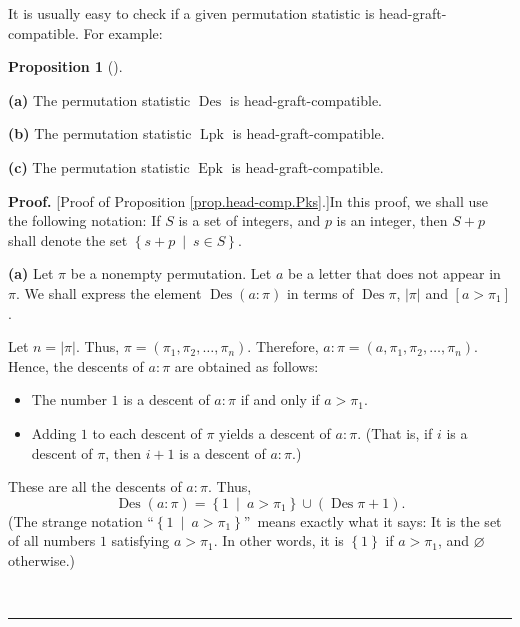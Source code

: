 \documentclass[numbers=enddot,12pt,final,onecolumn,notitlepage]{scrartcl}%
\theoremstyle{definition}
\newtheorem{prop}[theo]{Proposition}
\newenvironment{proposition}[1][]
{\begin{prop}[#1]\begin{leftbar}}
{\end{leftbar}\end{prop}}
\newenvironment{proof}[1][Proof]{\noindent\textbf{#1.} }{\ \rule{0.5em}{0.5em}}
\begin{document}
It is usually easy to check if a given permutation statistic is
head-graft-compatible. For example:

\begin{proposition}
\label{prop.head-comp.Pks}\textbf{(a)} The permutation statistic
$\operatorname*{Des}$ is head-graft-compatible.

\textbf{(b)} The permutation statistic $\operatorname*{Lpk}$ is head-graft-compatible.

\textbf{(c)} The permutation statistic $\operatorname*{Epk}$ is head-graft-compatible.
\end{proposition}

\begin{proof}
[Proof of Proposition \ref{prop.head-comp.Pks}.]In this proof, we shall use
the following notation: If $S$ is a set of integers, and $p$ is an integer,
then $S+p$ shall denote the set $\left\{  s+p\ \mid\ s\in S\right\}  $.

\textbf{(a)} Let $\pi$ be a nonempty permutation. Let $a$ be a letter that
does not appear in $\pi$. We shall express
the element $\operatorname*{Des}\left(  a:\pi\right)  $ in terms of
$\operatorname*{Des}\pi$, $\left|\pi\right|$
and $\left[  a>\pi_{1}\right]  $.

Let $n=\left\vert \pi\right\vert $. Thus, $\pi=\left(  \pi_{1},\pi
_{2},\ldots,\pi_{n}\right)  $. Therefore, $a:\pi=\left(  a,\pi_{1},\pi_{2}%
,\ldots,\pi_{n}\right)  $. Hence, the descents of $a:\pi$ are obtained as follows:

\begin{itemize}
\item The number $1$ is a descent of $a:\pi$ if and only if $a>\pi_{1}$.

\item Adding $1$ to each descent of $\pi$ yields a descent of $a:\pi$. (That
is, if $i$ is a descent of $\pi$, then $i+1$ is a descent of $a:\pi$.)
\end{itemize}

These are all the descents of $a:\pi$. Thus,%
\begin{equation}
\operatorname*{Des}\left(  a:\pi\right)  =\left\{  1\ \mid\ a>\pi_{1}\right\}
\cup\left(  \operatorname*{Des}\pi+1\right)  .
\label{pf.prop.head-comp.Pks.a.1}%
\end{equation}
(The strange notation \textquotedblleft$\left\{  1\ \mid\ a>\pi_{1}\right\}
$\textquotedblright\ means exactly what it says: It is the set of all numbers
$1$ satisfying $a>\pi_{1}$. In other words, it is $\left\{  1\right\}  $ if
$a>\pi_{1}$, and $\varnothing$ otherwise.)


\end{proof}
\end{document}
